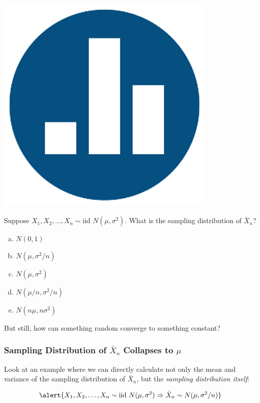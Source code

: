 \begin{frame}
\frametitle{\includegraphics[scale = 0.05]{./images/clicker}}
Suppose $X_1, X_2, \hdots, X_n \sim \mbox{iid } N(\mu,\sigma^2)$. What is the sampling distribution of $\bar{X}_n$?

\begin{enumerate}[(a)]
\item $N(0,1)$
\item $N(\mu, \sigma^2/n)$
\item $N(\mu, \sigma^2)$
\item $N(\mu/n, \sigma^2/n)$
\item $N(n\mu, n\sigma^2)$
\end{enumerate}

\end{frame}

\begin{frame}
\huge\begin{center} But still, how can something random converge to something constant? \end{center}
\end{frame}

\begin{frame}
\frametitle{Sampling Distribution of $\bar{X}_n$ Collapses to $\mu$}
Look at an example where we can directly calculate not only the mean and variance of the sampling distribution of $\bar{X}_n$, but the \emph{sampling distribution itself}:

\vspace{1em}
$$\alert{X_1, X_2, \hdots, X_n \sim \mbox{iid } N(\mu,\sigma^2) \Rightarrow \bar{X}_n \sim N(\mu, \sigma^2/n)}$$


\end{frame}




